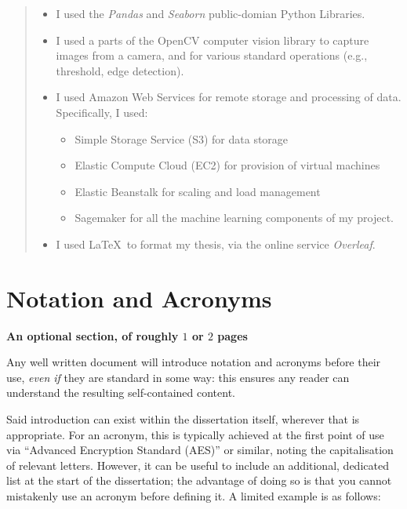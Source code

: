 \documentclass[ %
                    author={Daniel Page},
                supervisor={Dr. Andrew Calway},
                    degree={MSc},
                     title={Some Structural Guidelines for Data Science MSc Theses, Including Those With Long Titles that Run Across Multiple Lines on the Front Page},
                  subtitle={And those including an optional subtitle too, for good measure},
                      type={},
                      year={2021}]{dissertation}
\begin{document}
\begin{quote}
\noindent
\begin{itemize}

\item I used the {\em Pandas} and {\em Seaborn} public-domian Python Libraries. 

\item I used a parts of the OpenCV computer vision library to capture 
      images from a camera, and for various standard operations (e.g., 
      threshold, edge detection).

\item I used Amazon Web Services for remote storage and processing of data. Specifically, I used:
 \begin{itemize}
 \item Simple Storage Service (S3) for data storage
 \item Elastic Compute Cloud (EC2) for provision of virtual machines
 \item Elastic Beanstalk for scaling and load management
 \item Sagemaker for all the machine learning components of my project. 
 \end{itemize}
 
\item I used \LaTeX\ to format my thesis, via the online service {\em Overleaf}. 
\end{itemize}
\end{quote}


\chapter*{Notation and Acronyms}

{\bf An optional section, of roughly $1$ or $2$ pages}
\vspace{1cm} 

\noindent
Any well written document will introduce notation and acronyms before
their use, {\em even if} they are standard in some way: this ensures 
any reader can understand the resulting self-contained content.  

Said introduction can exist within the dissertation itself, wherever 
that is appropriate.  For an acronym, this is typically achieved at 
the first point of use via ``Advanced Encryption Standard (AES)'' or 
similar, noting the capitalisation of relevant letters.  However, it 
can be useful to include an additional, dedicated list at the start 
of the dissertation; the advantage of doing so is that you cannot 
mistakenly use an acronym before defining it.  A limited example is 
as follows:
\end{document}
